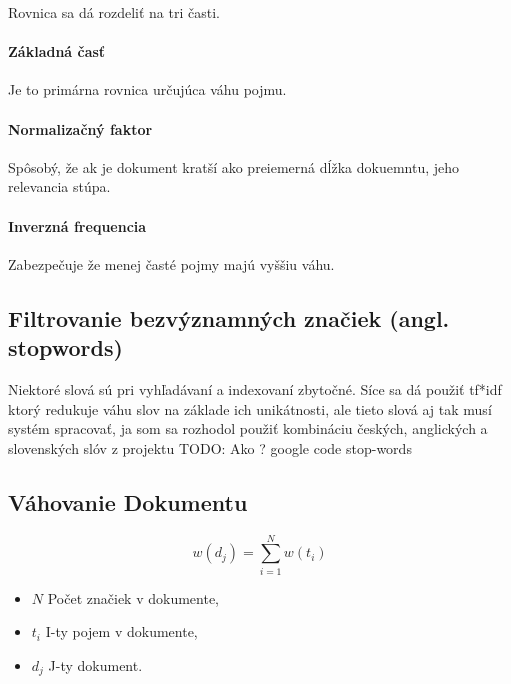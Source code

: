 Rovnica sa dá rozdeliť na tri časti. 


\paragraph{Základná časť}
Je to primárna rovnica určujúca váhu pojmu.

\paragraph{Normalizačný faktor} 
Spôsobý, že ak je dokument kratší ako preiemerná dĺžka dokuemntu,
jeho relevancia stúpa. \cite{pivoted_doc_len}

\paragraph{Inverzná frequencia}
Zabezpečuje že menej časté pojmy majú vyššiu váhu.

\subsection{Filtrovanie bezvýznamných značiek (angl. stopwords)}

Niektoré slová sú pri vyhľadávaní a indexovaní zbytočné. Síce 
sa dá použiť tf*idf ktorý redukuje váhu slov na základe ich 
unikátnosti, ale tieto slová aj tak musí systém spracovať, ja som 
sa rozhodol použiť kombináciu českých, anglických a slovenských slóv z
projektu TODO: Ako ? google code stop-words

\subsection{Váhovanie Dokumentu}

\[w(d_j) = \sum_{i=1}^{N} w(t_i) \]

\begin{itemize}
\item{\(N\)} Počet značiek v dokumente,
\item{\(t_i\)} I-ty pojem v dokumente,
\item{\(d_j\)} J-ty dokument.
\end{itemize}

